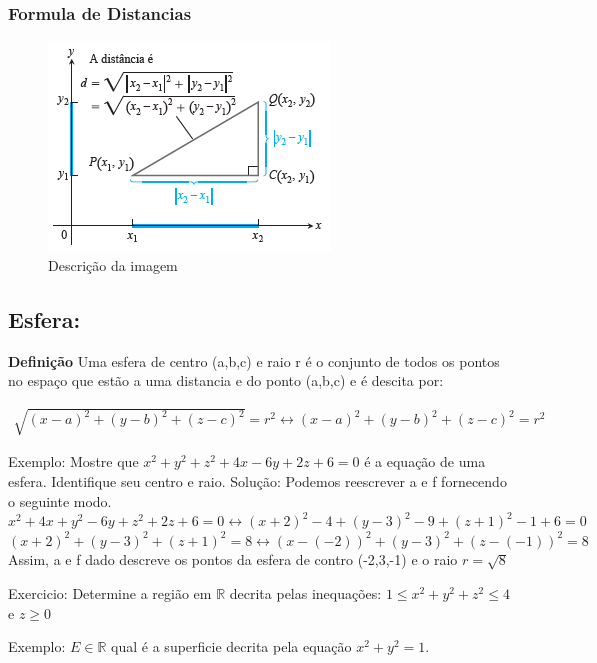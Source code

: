 \subsubsection{Formula de Distancias}
\begin{figure}[!h]
    \centering
    \includegraphics{sources/img/graficodistancia.png}
    \caption{Descrição da imagem}
    \label{fig:exemplo}
\end{figure}


\subsection{Esfera:}
\textbf{Definição}
Uma esfera de centro (a,b,c) e raio r é o conjunto de todos os pontos no espaço que estão a uma distancia e do ponto (a,b,c) e é descita por:
\begin{center}
\begin{align}
    \sqrt{(x-a)^2 + (y-b)^2 + (z-c)^2} = r^2 \leftrightarrow (x-a)^2 + (y-b)^2 + (z-c)^2 = r^2 
\end{align}
\end{center}

Exemplo: Mostre que $x^2 + y^2 + z^2 + 4x - 6y +2z + 6 = 0$ é a equação de uma esfera.
Identifique seu centro e raio. 
Solução: 
Podemos reescrever a e f fornecendo o seguinte modo.
$x^2 + 4x + y^2 -6y + z^2 +2z + 6 = 0 \leftrightarrow (x+2)^2  -4 + (y-3)^2 - 9 + (z+1)^2 -1 + 6 = 0$ \\
$(x+2)^2 + (y-3)^2 + (z+1)^2 = 8 \leftrightarrow (x-(-2))^2 + (y-3)^2 + (z-(-1))^2 = 8$ \\
Assim, a e f dado descreve os pontos da esfera de contro (-2,3,-1) e o raio $r=\sqrt{8}$

Exercicio: Determine a região em $\mathbb{R}$ decrita pelas inequações:
$1 \leq x^2 + y^2 + z^2 \leq 4$ e $ z \geq 0$

Exemplo: $E \in \mathbb{R}$ qual é a superficie decrita pela equação $x^2 + y^2 =1$. 
